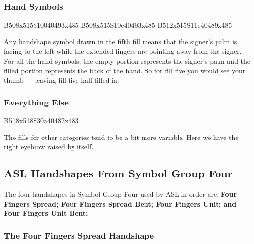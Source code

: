 \documentclass{article}
\begin{document}
\subsubsection{Hand Symbols}

\begin{center}
B508x515S10040493x485 B508x515S10e40493x485 B512x515S11e40489x485
\end{center}

Any handshape symbol drawn in the fifth fill means that the signer's palm is facing to the left while the extended fingers are pointing away from the signer.
For all the hand symbols, the empty portion represents the signer's palm and the filled portion represents the back of the hand.
So for fill five you would see your thumb --- leaving fill five half filled in.

\subsubsection{Everything Else}

\begin{center}
B518x518S30a40482x483
\end{center}

The fills for other categories tend to be a bit more variable.
Here we have the right eyebrow raised by itself.

\subsection{ASL Handshapes From Symbol Group Four}

The four handshapes in Symbol Group Four used by ASL in order are:
{\bf
Four Fingers Spread;
Four Fingers Spread Bent;
Four Fingers Unit;
and Four Fingers Unit Bent;
}

\subsubsection{The Four Fingers Spread Handshape}
\end{document}
